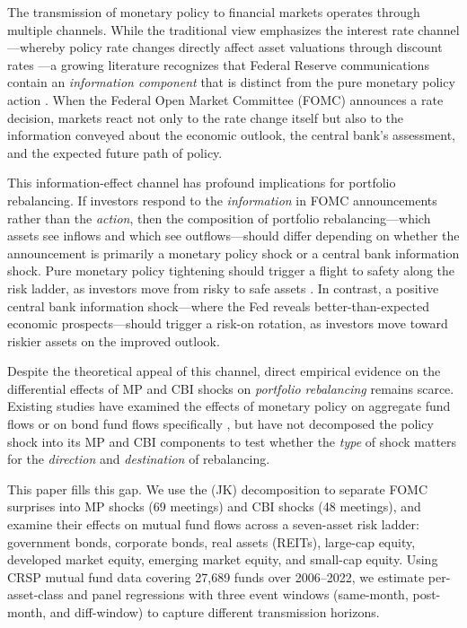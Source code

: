 \documentclass[11pt,a4paper]{article}
\begin{document}
The transmission of monetary policy to financial markets operates through multiple channels. While the traditional view emphasizes the interest rate channel---whereby policy rate changes directly affect asset valuations through discount rates \citep{tobin1969general, bernanke2005irregularities}---a growing literature recognizes that Federal Reserve communications contain an \textit{information component} that is distinct from the pure monetary policy action \citep{nakamura2018high, jarocinski2020deconstructing, bauer2023reassessment}. When the Federal Open Market Committee (FOMC) announces a rate decision, markets react not only to the rate change itself but also to the information conveyed about the economic outlook, the central bank's assessment, and the expected future path of policy.

This information-effect channel has profound implications for portfolio rebalancing. If investors respond to the \textit{information} in FOMC announcements rather than the \textit{action}, then the composition of portfolio rebalancing---which assets see inflows and which see outflows---should differ depending on whether the announcement is primarily a monetary policy shock or a central bank information shock. Pure monetary policy tightening should trigger a flight to safety along the risk ladder, as investors move from risky to safe assets \citep{bernanke2005irregularities, gurkaynak2005actions}. In contrast, a positive central bank information shock---where the Fed reveals better-than-expected economic prospects---should trigger a risk-on rotation, as investors move toward riskier assets on the improved outlook.

Despite the theoretical appeal of this channel, direct empirical evidence on the differential effects of MP and CBI shocks on \textit{portfolio rebalancing} remains scarce. Existing studies have examined the effects of monetary policy on aggregate fund flows \citep{fecht2026mutual, ciminelli2022monetary} or on bond fund flows specifically \citep{blanco2025bond}, but have not decomposed the policy shock into its MP and CBI components to test whether the \textit{type} of shock matters for the \textit{direction} and \textit{destination} of rebalancing.

This paper fills this gap. We use the \citet{jarocinski2020deconstructing} (JK) decomposition to separate FOMC surprises into MP shocks (69 meetings) and CBI shocks (48 meetings), and examine their effects on mutual fund flows across a seven-asset risk ladder: government bonds, corporate bonds, real assets (REITs), large-cap equity, developed market equity, emerging market equity, and small-cap equity. Using CRSP mutual fund data covering 27,689 funds over 2006--2022, we estimate per-asset-class and panel regressions with three event windows (same-month, post-month, and diff-window) to capture different transmission horizons.
\end{document}
